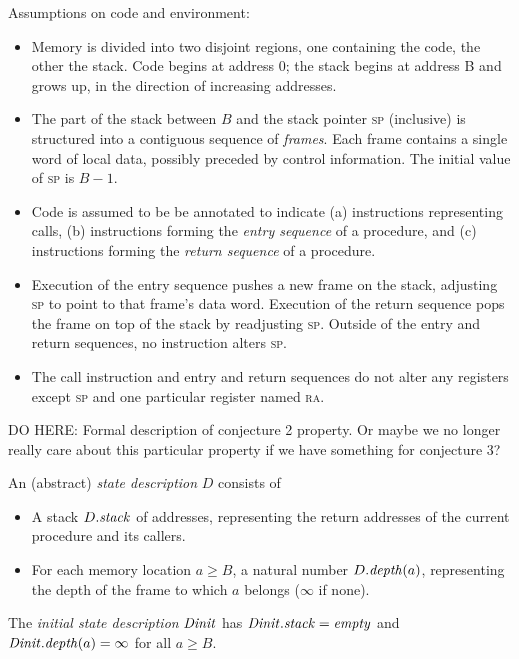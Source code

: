 \documentclass[conference]{IEEEtran}
\begin{document}
Assumptions on code and environment:
\begin{itemize}
\item
  Memory is divided into two disjoint regions, one containing the code, the other the stack.
  Code begins at address 0; the stack begins at address B and grows up, in the direction of increasing addresses.
\item
  The part of the stack between $B$ and the stack pointer \textsc{sp} (inclusive) is structured into a contiguous sequence of
  \emph{frames}. Each frame contains a single word of local data, possibly preceded by control information. 
  The initial value of \textsc{sp} is $B-1$.
\item
  Code is assumed to be be annotated to indicate (a) instructions representing calls, (b) instructions forming the \emph{entry sequence} of
  a procedure, and (c) instructions forming the \emph{return sequence} of a procedure.
\item
  Execution of the entry sequence pushes a new frame on the stack, adjusting \textsc{sp} to point to that
  frame's data word.  Execution of the return sequence pops the frame on top of the stack by readjusting \textsc{sp}.
  Outside of the entry and return sequences, no instruction alters \textsc{sp}.
\item
  The call instruction and entry and return sequences do not alter any registers except \textsc{sp} and one
  particular register named \textsc{ra}.
\end{itemize}

DO HERE: Formal description of conjecture 2 property.  Or maybe we no longer really care about this particular property if we have something for conjecture 3?

An (abstract) \emph{state description} $D$ consists of
\begin{itemize}
\item
  A stack ${D}.\relax{\it stack}$ of addresses, representing the return addresses of the current procedure and its callers.
\item
  For each memory location $a \geq B$, a natural number ${D}.\relax{\it depth}({a})$, representing the depth
  of the frame to which $a$ belongs ($\infty$ if none).
\end{itemize}

The \emph{initial state description} $\relax{\it Dinit}$ has ${\relax{\it Dinit}}.\relax{\it stack} = \relax{\it empty}$ and ${\relax{\it Dinit}}.\relax{\it depth}({a}) = \infty$ for all $a \geq B$.
\end{document}
